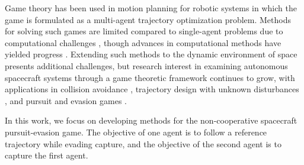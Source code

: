 Game theory has been used in motion planning for robotic systems in which the game is formulated as a multi-agent trajectory optimization problem.
Methods for solving such games are limited compared to single-agent problems due to computational challenges , though 
advances in computational methods have yielded progress . 
Extending such methods to the dynamic environment of space presents additional challenges, but 
% 
research interest in examining autonomous spacecraft systems through a game theoretic framework continues to grow, with 
applications in  
collision avoidance \cite{bombardelli2015optimal}, trajectory design with unknown disturbances \cite{olympio2010designing}, and pursuit and evasion games \cite{pontani2009numerical, stupik2012optimal}.    
% 

% 
In this work, we focus on developing methods for the non-cooperative spacecraft pursuit-evasion game.
The objective of one agent is to follow a reference trajectory while evading capture, and the objective of the second agent is to capture the first agent. 

